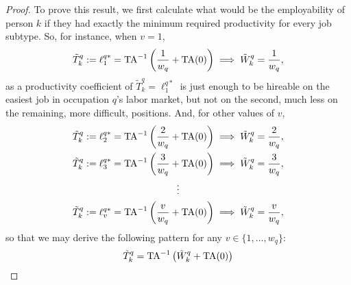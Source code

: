 \documentclass[hidelinks, nonatbib]{elsarticle}
\begin{document}
\begin{corollary}
    \begin{proof}
        To prove this result, we first calculate what would be the employability of person $k$ if they had exactly the minimum required productivity for every job subtype. So, for instance, when $v = 1$,
        \begin{align}
            \tilde{T}_{k}^{q}
            :=
            \ell_{1}^{q*}
            =
            \text{TA}^{-1}
            \left(
                \frac{1}{w_q}
                +
                \text{TA}(0)
            \right)
            \implies
            \tilde{W}_{k}^{q}
            =
            \frac{1}{w_q}
            ,
        \end{align}
        as a productivity coefficient of $\tilde{T}_{k}^{q} = \ell_{1}^{q*}$ is just enough to be hireable on the easiest job in occupation $q$'s labor market, but not on the second, much less on the remaining, more difficult, positions. And, for other values of $v$,
        \begin{gather}
            \tilde{T}_{k}^{q}
            :=
            \ell_{2}^{q*}
            =
            \text{TA}^{-1}
            \left(
                \frac{2}{w_q}
                +
                \text{TA}(0)
            \right)
            \implies
            \tilde{W}_{k}^{q}
            =
            \frac{2}{w_q}
            ,
            \\
            \tilde{T}_{k}^{q}
            :=
            \ell_{3}^{q*}
            =
            \text{TA}^{-1}
            \left(
                \frac{3}{w_q}
                +
                \text{TA}(0)
            \right)
            \implies
            \tilde{W}_{k}^{q}
            =
            \frac{3}{w_q}
            ,
            \\
            \vdots
            \\
            \tilde{T}_{k}^{q}
            :=
            \ell_{v}^{q*}
            =
            \text{TA}^{-1}
            \left(
                \frac{v}{w_q}
                +
                \text{TA}(0)
            \right)
            \implies
            \tilde{W}_{k}^{q}
            =
            \frac{v}{w_q}
            ,
        \end{gather}
        so that we may derive the following pattern for any $v \in \{1, \dots, w_q\}$:
        \begin{align}
            &\tilde{T}_{k}^{q}
            =
            \invTA
            \left(
                \tilde{W}_{k}^{q}
                +
                \TA(0)
            \right)
            \\

\end{align}
\end{proof}
\end{corollary}
\end{document}

